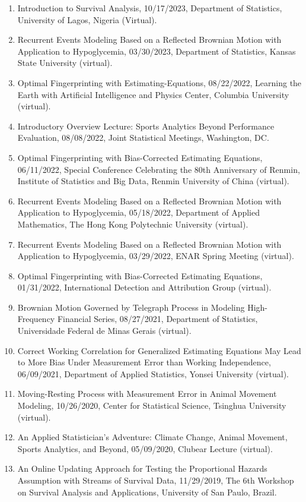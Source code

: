 \documentclass[Statistics]{vita}
\begin{document}
\begin{vita}
\begin{enumerate}
  \item Introduction to Survival Analysis, 10/17/2023, Department of Statistics, University of Lagos, Nigeria (Virtual).
  \item Recurrent Events Modeling Based on a Reflected Brownian Motion with Application to Hypoglycemia, 03/30/2023, Department of Statistics, Kansas State University (virtual).
  \item Optimal Fingerprinting with Estimating-Equations, 08/22/2022, Learning the Earth with Artificial Intelligence and Physics Center, Columbia University (virtual).
  \item Introductory Overview Lecture: Sports Analytics Beyond Performance Evaluation, 08/08/2022, Joint Statistical Meetings, Washington, DC.
  \item Optimal Fingerprinting with Bias-Corrected Estimating Equations, 06/11/2022, Special Conference Celebrating the 80th Anniversary of Renmin, Institute of Statistics and Big Data, Renmin University of China (virtual).
  \item Recurrent Events Modeling Based on a Reflected Brownian Motion with Application to Hypoglycemia, 05/18/2022, Department of Applied Mathematics, The Hong Kong Polytechnic University (virtual).
  \item Recurrent Events Modeling Based on a Reflected Brownian Motion with Application to Hypoglycemia, 03/29/2022, ENAR Spring Meeting (virtual).
  \item Optimal Fingerprinting with Bias-Corrected Estimating Equations, 01/31/2022, International Detection and Attribution Group (virtual).
  \item Brownian Motion Governed by Telegraph Process in Modeling High-Frequency Financial Series, 08/27/2021, Department of Statistics, Universidade Federal de Minas Gerais (virtual).
  \item Correct Working Correlation for Generalized Estimating Equations May Lead to More Bias Under Measurement Error than Working Independence, 06/09/2021, Department of Applied Statistics, Yonsei University (virtual).
  \item Moving-Resting Process with Measurement Error in Animal Movement Modeling, 10/26/2020, Center for Statistical Science, Tsinghua University (virtual).
  \item An Applied Statistician's Adventure: Climate Change, Animal Movement, Sports Analytics, and Beyond, 05/09/2020, Clubear Lecture (virtual).
  \item An Online Updating Approach for Testing the Proportional Hazards Assumption with Streams of Survival Data, 11/29/2019, The 6th Workshop on Survival Analysis and Applications, University of San Paulo, Brazil.

\end{enumerate}
\end{vita}
\end{document}
